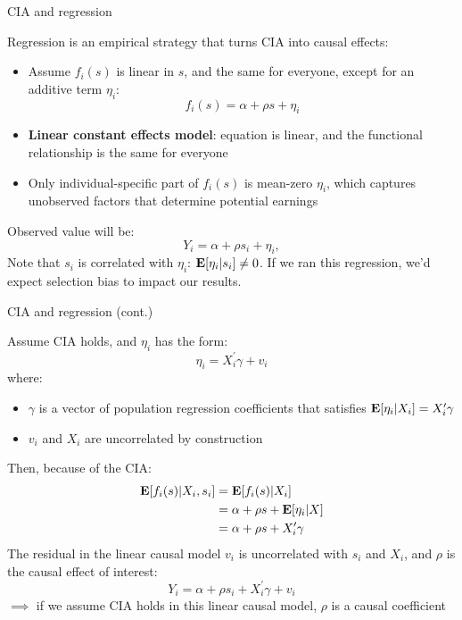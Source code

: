 \documentclass[compress, 8pt]{beamer}
\begin{document}


\begin{frame}{CIA and regression}

Regression is an empirical strategy that turns CIA into causal effects:
\begin{itemize}
    \item Assume $f_i(s)$ is linear in $s$, and the same for everyone, except for an additive term $\eta_i$:
    \begin{equation*}
        f_i(s) = \alpha + \rho s + \eta_i
    \end{equation*}
    \item \textbf{Linear constant effects model}: equation is linear, and the functional relationship is the same for everyone
    \item Only individual-specific part of $f_i(s)$ is mean-zero $\eta_i$, which captures unobserved factors that determine potential earnings
\end{itemize}
Observed value will be:
\begin{equation*}
    Y_i = \alpha + \rho s_i + \eta_i, 
\end{equation*}
Note that $s_i$ is correlated with $\eta_i$: $\mathbf{E} [\eta_i \vert s_i] \neq 0$. If we ran this regression, we'd expect selection bias to impact our results.

\end{frame}

\begin{frame}{CIA and regression (cont.)}

Assume CIA holds, and $\eta_i$ has the form:
\begin{equation*}
    \eta_i = X_i^\prime \gamma + v_i
\end{equation*}
where: 
\begin{itemize}
    \item $\gamma$ is a vector of population regression coefficients that satisfies $\mathbf{E} [\eta_i \vert X_i] = X_i^\prime \gamma$
    \item $v_i$ and $X_i$ are uncorrelated by construction
\end{itemize}
Then, because of the CIA:
\begin{align*}
    \mathbf{E} [f_i(s) \vert X_i, s_i] &= \mathbf{E}[f_i (s) \vert X_i] \\
    &= \alpha + \rho s + \mathbf{E} [\eta_i \vert X] \\
    &= \alpha + \rho s + X_i^\prime \gamma
\end{align*}
The residual in the linear causal model $v_i$ is uncorrelated with $s_i$ and $X_i$, and $\rho$ is the causal effect of interest:
\begin{equation*}
    Y_i = \alpha + \rho s_i + X_i^\prime \gamma + v_i
\end{equation*}
$\implies$ if we assume CIA holds in this linear causal model, $\rho$ is a causal coefficient
\end{frame}
\end{document}
